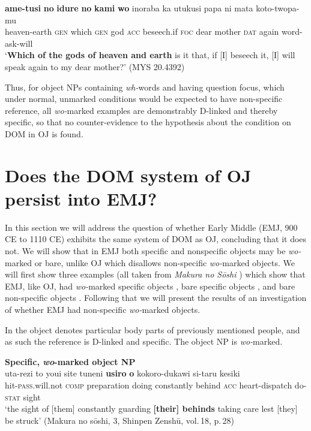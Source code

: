 \documentclass[output=paper]{LSP/langsci}
\begin{document}
\begin{exe}
\ex%
\label{07-fr-ex:31}
\gll \textbf{ame-tusi} \textbf{no} \textbf{idure} \textbf{no} \textbf{kami} \textbf{wo} inoraba ka utukusi papa ni mata koto-twopa-mu\\
heaven-earth \textsc{gen} which \textsc{gen} god \textsc{acc} beseech.if \textsc{foc} dear mother \textsc{dat} again word-ask-will\\
\glt ‘\textbf{Which of the gods of heaven and earth} is it that, if [I] beseech it, [I] will speak again to my dear mother?’   (MYS 20.4392)
\end{exe}

Thus, for object NPs containing \textit{wh-}words and having question focus, which under normal, unmarked conditions would be expected to have non-specific reference, all \textit{wo-}marked examples are demonstrably D-linked and thereby specific, so that no counter-evidence to the hypothesis about the condition on DOM in OJ    is found. 

\section{Does the DOM system of OJ persist into EMJ?}
\label{07-sec:3}

In this section we will address the question of whether Early Middle
 (EMJ, 900 CE to 1110 CE) exhibits the same system of DOM as
OJ, concluding that it does not. We will show that in EMJ both
specific and nonspecific objects may be \textit{wo-}marked or bare,
unlike OJ   which disallows non-specific \textit{wo-}marked objects. We
will first show three examples (all taken from \textit{Makura no
 Sōshi} %
) which show that EMJ, like OJ, had \textit{wo-}marked
specific objects , bare specific objects , and bare non-specific objects . Following that we will present the results of an investigation of whether EMJ had non-specific \textit{wo-}marked
objects.

In  the object denotes particular body parts of previously
mentioned people, and as such the reference is D-linked and
specific. The object NP is \-\textit{wo-}marked.

\begin{exe}
\ex
\label{07-fr-ex:32}
\textbf{Specific, \textit{wo}-marked object NP}\\
\gll uta-rezi to youi site tuneni \textbf{usiro} \textbf{o} kokoro-dukawi si-taru kesiki\\
hit-\textsc{pass}.will.not \textsc{comp} preparation doing constantly  behind \textsc{acc}  heart-dispatch do-\textsc{stat} sight\\
\glt ‘the sight of [them] constantly guarding \textbf{[their] behinds} taking care lest [they] be struck’  (Makura no sōshi, 3, Shinpen Zenshū, vol.\,18, p.\,28)
\end{exe}
\end{document}
